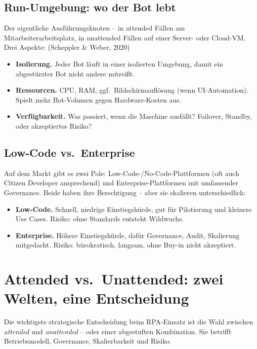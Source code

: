 \documentclass[11pt,a4paper,oneside]{article}
\newcommand{\quelle}[1]{{\footnotesize\color{lpGray}(#1)}}
\begin{document}
\subsection{Run-Umgebung: wo der Bot lebt}

Der eigentliche Ausführungsknoten -- in attended Fällen am Mitarbeiterarbeitsplatz, in unattended Fällen auf einer Server- oder Cloud-VM. Drei Aspekte: \quelle{Scheppler \& Weber, 2020}

\begin{itemize}
  \item \textbf{Isolierung.} Jeder Bot läuft in einer isolierten Umgebung, damit ein abgestürzter Bot nicht andere mitreißt.
  \item \textbf{Ressourcen.} CPU, RAM, ggf.\ Bildschirmauflösung (wenn UI-Automation). Spielt mehr Bot-Volumen gegen Hardware-Kosten aus.
  \item \textbf{Verfügbarkeit.} Was passiert, wenn die Maschine ausfällt? Failover, Standby, oder akzeptiertes Risiko?
\end{itemize}

\subsection{Low-Code vs.\ Enterprise}

Auf dem Markt gibt es zwei Pole: Low-Code-/No-Code-Plattformen (oft auch Citizen Developer ansprechend) und Enterprise-Plattformen mit umfassender Governance. Beide haben ihre Berechtigung -- aber sie skalieren unterschiedlich:

\begin{itemize}
  \item \textbf{Low-Code.} Schnell, niedrige Einstiegshürde, gut für Pilotierung und kleinere Use Cases. Risiko: ohne Standards entsteht Wildwuchs.
  \item \textbf{Enterprise.} Höhere Einstiegshürde, dafür Governance, Audit, Skalierung mitgedacht. Risiko: bürokratisch, langsam, ohne Buy-in nicht akzeptiert.
\end{itemize}

\section{Attended vs.\ Unattended: zwei Welten, eine Entscheidung}

Die wichtigste strategische Entscheidung beim RPA-Einsatz ist die Wahl zwischen \emph{attended} und \emph{unattended} -- oder einer abgestuften Kombination. Sie betrifft Betriebsmodell, Governance, Skalierbarkeit und Risiko.
\end{document}
